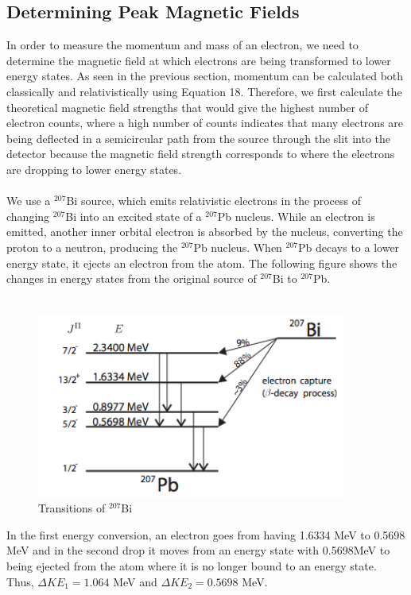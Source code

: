 \subsection{Determining Peak Magnetic Fields}
In order to measure the momentum and mass of an electron, we need to determine the magnetic field at which electrons are being transformed to lower energy states. As seen in the previous section, momentum can be calculated both classically and relativistically using Equation 18. Therefore, we first calculate the theoretical magnetic field strengths that would give the highest number of electron counts, where a high number of counts indicates that many electrons are being deflected in a semicircular path from the source through the slit into the detector because the magnetic field strength corresponds to where the electrons are dropping to lower energy states. \\ \\
We use a $^{207}$Bi source, which emits relativistic electrons in the process of changing $^{207}$Bi into an excited state of a $^{207}$Pb nucleus. While an electron is emitted, another inner orbital electron is absorbed by the nucleus, converting the proton to a neutron, producing the $^{207}$Pb nucleus. When $^{207}$Pb decays to a lower energy state, it ejects an electron from the atom. The following figure shows the changes in energy states from the original source of $^{207}$Bi to $^{207}$Pb. \\
\\
\begin{figure}[H]
\begin{center}
\includegraphics[width=4in]{energylevels.png}
\caption{Transitions of $^{207}$Bi}
\end{center}
\end{figure}
\medskip
In the first energy conversion, an electron goes from having 1.6334 MeV to 0.5698 MeV and in the second drop it moves from an energy state with 0.5698MeV to being ejected from the atom where it is no longer bound to an energy state. Thus, $\Delta KE_1=1.064$ MeV and $\Delta KE_2= 0.5698$ MeV. \\
